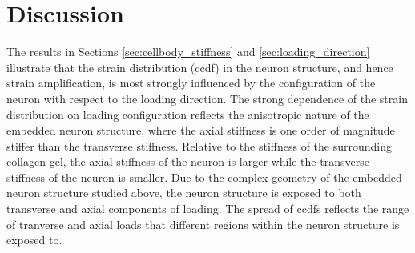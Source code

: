 \documentclass[]{interact}
\begin{document}

\section{Discussion}
\label{sec:discussion}
The results in Sections \ref{sec:cellbody_stiffness} and \ref{sec:loading_direction} illustrate that the strain distribution (ccdf) in the neuron structure, and hence strain amplification, is most strongly influenced by the configuration of the neuron with respect to the loading direction. The strong dependence of the strain distribution on loading configuration reflects the anisotropic nature of the embedded neuron structure, where the axial stiffness is one order of magnitude stiffer than the transverse stiffness. Relative to the stiffness of the surrounding collagen gel, the axial stiffness of the neuron is larger while the transverse stiffness of the neuron is smaller. Due to the complex geometry of the embedded neuron structure studied above, the neuron structure is exposed to both transverse and axial components of loading. The spread of ccdfs reflects the range of tranverse and axial loads that different regions within the neuron structure is exposed to.
\end{document}
